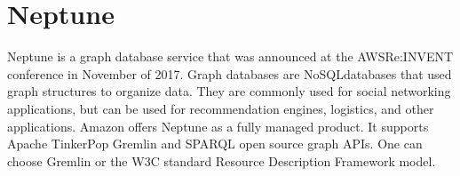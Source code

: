 \section{Neptune}

Neptune is a graph database service that was
announced at the AWSRe:INVENT conference in November of
2017\cite{hid-sp18-419-www-tc_neptune}. Graph databases are
NoSQLdatabases that used graph structures to organize
data\cite{hid-sp18-419-www-tp-graph-db}. They are commonly used for
social networking applications, but can be used for recommendation
engines, logistics, and other applications. Amazon
offers Neptune as a fully managed product. It supports Apache
TinkerPop Gremlin and
SPARQL open source graph APIs. One can choose Gremlin or
the W3C standard Resource Description
Framework
model\cite{hid-sp18-419-www-aws-neptune}.
